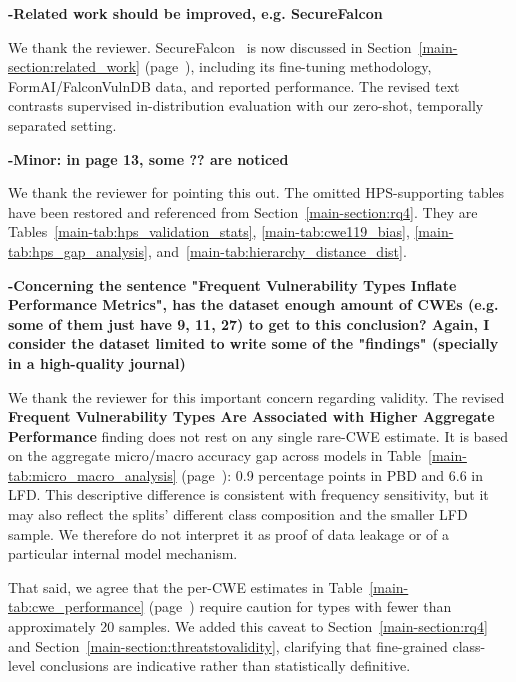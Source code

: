\documentclass[journal,onecolumn]{IEEEtran}
\newif\ifworkspacecompile
\begin{document}
\textbf{-Related work should be improved, e.g. SecureFalcon}

We thank the reviewer. SecureFalcon~\cite{ferrag2025securefalcon} is now discussed in Section~\ref{main-section:related_work} (page~\pageref{main-section:related_work}), including its fine-tuning methodology, FormAI/FalconVulnDB data, and reported performance. The revised text contrasts supervised in-distribution evaluation with our zero-shot, temporally separated setting.

\textbf{-Minor: in page 13, some ?? are noticed}

We thank the reviewer for pointing this out. The omitted HPS-supporting tables have been restored and referenced from Section~\ref{main-section:rq4}. They are Tables~\ref{main-tab:hps_validation_stats}, \ref{main-tab:cwe119_bias}, \ref{main-tab:hps_gap_analysis}, and~\ref{main-tab:hierarchy_distance_dist}.

\textbf{-Concerning the sentence "Frequent Vulnerability Types Inflate Performance Metrics", has the dataset enough amount of CWEs (e.g. some of them just have 9, 11, 27) to get to this conclusion? Again, I consider the dataset limited to write some of the "findings" (specially in a high-quality journal)}

We thank the reviewer for this important concern regarding validity. The revised \textbf{Frequent Vulnerability Types Are Associated with Higher Aggregate Performance} finding does not rest on any single rare-CWE estimate. It is based on the aggregate micro/macro accuracy gap across models in Table~\ref{main-tab:micro_macro_analysis} (page~\pageref{main-tab:micro_macro_analysis}): 0.9 percentage points in PBD and 6.6 in LFD. This descriptive difference is consistent with frequency sensitivity, but it may also reflect the splits' different class composition and the smaller LFD sample. We therefore do not interpret it as proof of data leakage or of a particular internal model mechanism.
 
That said, we agree that the per-CWE estimates in Table~\ref{main-tab:cwe_performance} (page~\pageref{main-tab:cwe_performance}) require caution for types with fewer than approximately 20 samples. We added this caveat to Section~\ref{main-section:rq4} and Section~\ref{main-section:threatstovalidity}, clarifying that fine-grained class-level conclusions are indicative rather than statistically definitive.


\ifworkspacecompile
    
\else
    
\fi
\end{document}
